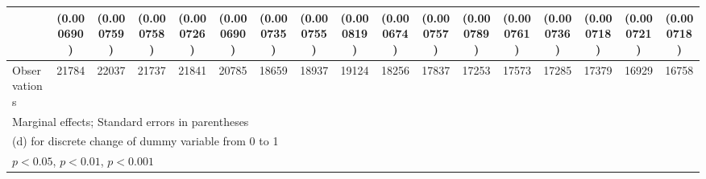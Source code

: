 {\begin{tabular}{l*{16}{c}}
                    &  (0.000690)         &  (0.000759)         &  (0.000758)         &  (0.000726)         &  (0.000690)         &  (0.000735)         &  (0.000755)         &  (0.000819)         &  (0.000674)         &  (0.000757)         &  (0.000789)         &  (0.000761)         &  (0.000736)         &  (0.000718)         &  (0.000721)         &  (0.000718)         \\
\hline
Observations        &       21784         &       22037         &       21737         &       21841         &       20785         &       18659         &       18937         &       19124         &       18256         &       17837         &       17253         &       17573         &       17285         &       17379         &       16929         &       16758         \\
\hline\hline
\multicolumn{17}{l}{\footnotesize Marginal effects; Standard errors in parentheses}\\
\multicolumn{17}{l}{\footnotesize  (d) for discrete change of dummy variable from 0 to 1}\\
\multicolumn{17}{l}{\footnotesize \sym{*} \(p<0.05\), \sym{**} \(p<0.01\), \sym{***} \(p<0.001\)}\\
\end{tabular}
}
